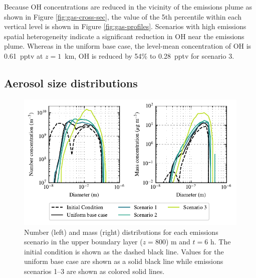 \documentclass[journal abbreviation, manuscript]{copernicus}
\begin{document}
Because OH concentrations are reduced in the vicinity of the emissions plume as shown in Figure \ref{fig:gas-cross-sec}, the value of the 5th percentile within each vertical level is shown in Figure \ref{fig:gas-profiles}. Scenarios with high emissions spatial heterogeneity indicate a significant reduction in OH near the emissions plume. Whereas in the uniform base case, the level-mean concentration of OH is 0.61~pptv at $z=1$~km, OH is reduced by 54\% to 0.28~pptv for scenario 3.  

\subsection{Aerosol size distributions}\label{sec:size-dist}

\begin{figure}[!h]
	\centering
	\includegraphics[]{figures/combined_num_mass_conc_i50_j50_k60.pdf}
	\caption{Number (left) and mass (right) distributions for each emissions scenario in the upper boundary layer ($z=800$) m and $t=6$ h. The initial condition is shown as the dashed black line. Values for the uniform base case are shown as a solid black line while emissions scenarios 1--3 are shown as colored solid lines.}
	\label{fig:size-dists}
\end{figure} 
\end{document}
